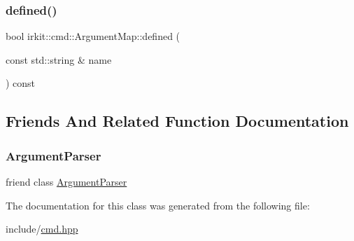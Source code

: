 \mbox{\label{classirkit_1_1cmd_1_1ArgumentMap_a37cc1269cc6c393fb0786fcd40325afb}} 
\subsubsection{\texorpdfstring{defined()}{defined()}}
{\footnotesize\ttfamily bool irkit\+::cmd\+::\+Argument\+Map\+::defined (\begin{DoxyParamCaption}\item[{const std\+::string \&}]{name }\end{DoxyParamCaption}) const\hspace{0.3cm}{\ttfamily [inline]}}



\subsection{Friends And Related Function Documentation}
\mbox{\label{classirkit_1_1cmd_1_1ArgumentMap_a55c9e1ac006a645af402e3aee6b64e00}} 
\subsubsection{\texorpdfstring{Argument\+Parser}{ArgumentParser}}
{\footnotesize\ttfamily friend class \mbox{\hyperlink{classirkit_1_1cmd_1_1ArgumentParser}{Argument\+Parser}}\hspace{0.3cm}{\ttfamily [friend]}}



The documentation for this class was generated from the following file\+:\begin{DoxyCompactItemize}
\item 
include/\mbox{\hyperlink{cmd_8hpp}{cmd.\+hpp}}\end{DoxyCompactItemize}

